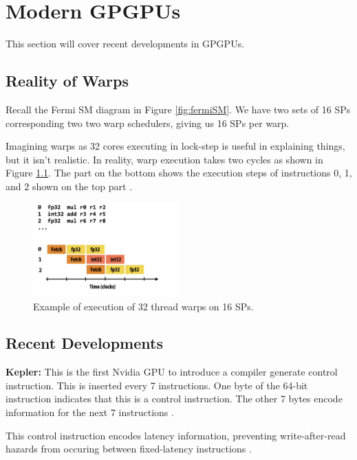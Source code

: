 \chapter{Modern GPGPUs}

This section will cover recent developments in GPGPUs.

\section{Reality of Warps}

Recall the Fermi SM diagram in Figure \ref{fig:fermiSM}.
We have two sets of 16 SPs corresponding
two two warp schedulers, giving us 16 SPs per warp.

Imagining warps as 32 cores executing in lock-step is useful in explaining things,
but it isn't realistic. In reality, warp execution takes two cycles as shown
in Figure \ref{fig:exec}. The part on the bottom shows the execution steps
of instructions 0, 1, and 2 shown on the top part \cite{yt}.

\begin{figure}[h]
    \centering
    \includegraphics[width=0.5\textwidth]{assets/execex.png}
    \caption{Example of execution of 32 thread warps on 16 SPs.}
    \label{fig:exec}
\end{figure}

\section{Recent Developments}

\textbf{Kepler:} This is the first Nvidia GPU to introduce a compiler generate control instruction.
This is inserted every 7 instructions. One byte of the 64-bit instruction indicates
that this is a control instruction. The other 7 bytes encode information for the
next 7 instructions \cite{chipsandcheeseInsideKepler}.

This control instruction encodes latency information, preventing write-after-read hazards
from occuring between fixed-latency instructions \cite{chipsandcheeseInsideKepler}.

